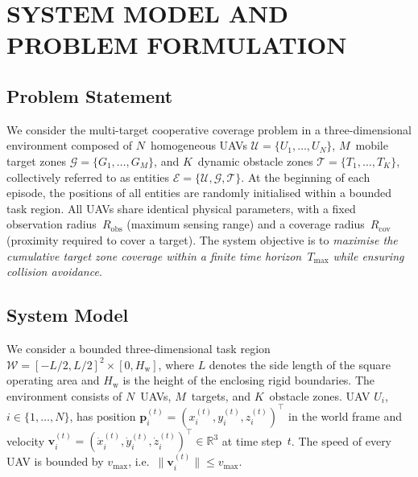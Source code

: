 
\section{SYSTEM MODEL AND PROBLEM FORMULATION}
\label{sec:system_model}

\subsection{Problem Statement}
\label{subsec:problem_statement}

We consider the multi-target cooperative coverage problem in a three-dimensional
environment composed of $N$~homogeneous UAVs
$\mathcal{U} = \{U_1, \dots, U_N\}$,
$M$~mobile target zones $\mathcal{G} = \{G_1, \dots, G_M\}$, and
$K$~dynamic obstacle zones $\mathcal{T} = \{T_1, \dots, T_K\}$, collectively
referred to as entities
$\mathcal{E} = \{\mathcal{U}, \mathcal{G}, \mathcal{T}\}$.
At the beginning of each episode, the positions of all entities are randomly
initialised within a bounded task region.
All UAVs share identical physical parameters, with a fixed observation
radius~$R_{\mathrm{obs}}$ (maximum sensing range) and a coverage
radius~$R_{\mathrm{cov}}$ (proximity required to cover a target).
The system objective is to \emph{maximise the cumulative target zone coverage within
a finite time horizon~$T_{\max}$ while ensuring collision avoidance}.

\subsection{System Model}
\label{subsec:system_model}

We consider a bounded three-dimensional task region
$\mathcal{W} = [-L/2, L/2]^{2} \times [0, H_{\mathrm{w}}]$, where $L$ denotes
the side length of the square operating area and $H_{\mathrm{w}}$ is the height
of the enclosing rigid boundaries.
The environment consists of $N$~UAVs, $M$~targets, and $K$~obstacle zones.
UAV $U_i$, $i \in \{1, \dots, N\}$, has position
$\mathbf{p}_i^{(t)} = (x_i^{(t)}, y_i^{(t)}, z_i^{(t)})^{\top}$ in the world
frame and velocity
$\mathbf{v}_i^{(t)} = (\dot{x}_i^{(t)}, \dot{y}_i^{(t)},
\dot{z}_i^{(t)})^{\top} \in \mathbb{R}^3$ at time step~$t$.
The speed of every UAV is bounded by $v_{\max}$, i.e.\
$\lVert\mathbf{v}_i^{(t)}\rVert \le v_{\max}$.

